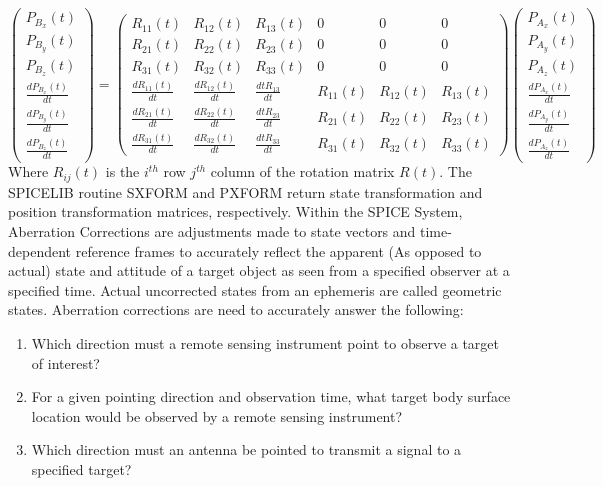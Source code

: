 \documentclass[crop=false,class=book]{standalone}
\begin{document}
\begin{equation}
\begin{pmatrix}P_{B_{x}}(t)\\P_{B_{y}}(t)\\P_{B_{z}}(t)\\ \frac{dP_{B_{x}}(t)}{dt}\\ \frac{dP_{B_{y}}(t)}{dt}\\ \frac{dP_{B_{z}}(t)}{dt}\end{pmatrix}=
\begin{pmatrix}R_{11}(t)&R_{12}(t)&R_{13}(t)&0&0&0\\R_{21}(t)&R_{22}(t)&R_{23}(t)&0&0&0\\R_{31}(t)&R_{32}(t)&R_{33}(t)&0&0&0\\\frac{dR_{11}(t)}{dt}&\frac{dR_{12}(t)}{dt}&\frac{dtR_{13}}{dt}&R_{11}(t)&R_{12}(t)&R_{13}(t)\\\frac{dR_{21}(t)}{dt}&\frac{dR_{22}(t)}{dt}&\frac{dtR_{23}}{dt}&R_{21}(t)&R_{22}(t)&R_{23}(t)\\
\frac{dR_{31}(t)}{dt}&\frac{dR_{32}(t)}{dt}&\frac{dtR_{33}}{dt}&R_{31}(t)&R_{32}(t)&R_{33}(t)\end{pmatrix}
\begin{pmatrix}P_{A_{x}}(t)\\P_{A_{y}}(t)\\P_{A_{z}}(t)\\ \frac{dP_{A_{x}}(t)}{dt}\\ \frac{dP_{A_{y}}(t)}{dt}\\ \frac{dP_{A_{z}}(t)}{dt}\end{pmatrix} 
\end{equation}
Where $R_{ij}(t)$ is the $i^{th}$ row $j^{th}$ column of the rotation matrix $R(t)$. The SPICELIB routine SXFORM and PXFORM return state transformation and position transformation matrices, respectively. Within the SPICE System, Aberration Corrections are adjustments made to state vectors and time-dependent reference frames to accurately reflect the apparent (As opposed to actual) state and attitude of a target object as seen from a specified observer at a specified time. Actual uncorrected states from an ephemeris are called geometric states. Aberration corrections are need to accurately answer the following:
\begin{enumerate}
    \item Which direction must a remote sensing instrument point to observe a target of interest?
    \item For a given pointing direction and observation time, what target body surface location would be observed by a remote sensing instrument?
    \item Which direction must an antenna be pointed to transmit a signal to a specified target?
\end{enumerate}
\end{document}
